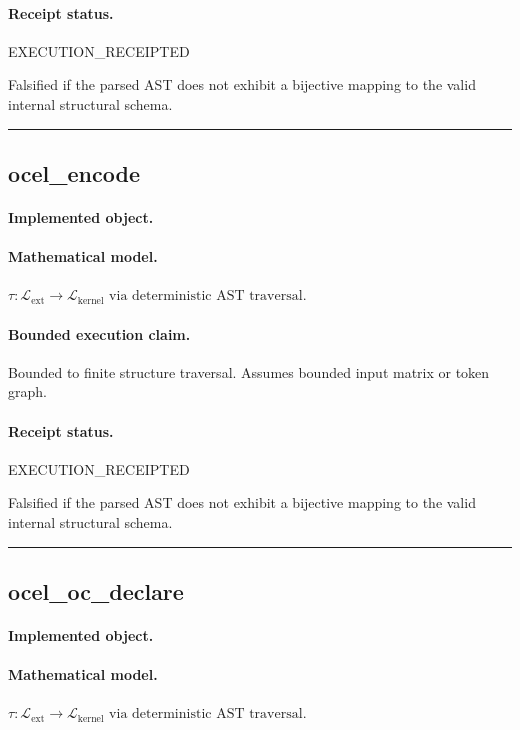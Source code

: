 \paragraph{Receipt status.} EXECUTION\_RECEIPTED
\begin{falsifier}
Falsified if the parsed AST does not exhibit a bijective mapping to the valid internal structural schema.
\end{falsifier}

\vspace{1em}\hrule\vspace{1em}
\subsection{ocel\_encode}
\paragraph{Implemented object.} 
\paragraph{Mathematical model.} $\tau : \mathcal{L}_{\text{ext}} \to \mathcal{L}_{\text{kernel}} \text{ via deterministic AST traversal}.$
\paragraph{Bounded execution claim.} Bounded to finite structure traversal. Assumes bounded input matrix or token graph.
\paragraph{Receipt status.} EXECUTION\_RECEIPTED
\begin{falsifier}
Falsified if the parsed AST does not exhibit a bijective mapping to the valid internal structural schema.
\end{falsifier}

\vspace{1em}\hrule\vspace{1em}
\subsection{ocel\_oc\_declare}
\paragraph{Implemented object.} 
\paragraph{Mathematical model.} $\tau : \mathcal{L}_{\text{ext}} \to \mathcal{L}_{\text{kernel}} \text{ via deterministic AST traversal}.$
